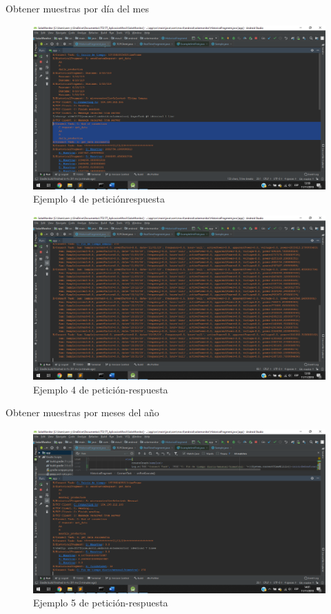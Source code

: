 Obtener muestras por día del mes
\begin{figure}[H]
	\centering
	\includegraphics[scale=.4]{Capitulo5/images/connect8.png}
	\caption{Ejemplo 4 de petición\-respuesta}	\label{fig:connect8}
\end{figure} 

\begin{figure}[H]
	\centering
	\includegraphics[scale=.4]{Capitulo5/images/connect9.png}
	\caption{Ejemplo 4 de petición-respuesta}	\label{fig:connect9}
\end{figure} 


Obtener muestras por meses del año
\begin{figure}[H]
	\centering
	\includegraphics[scale=.4]{Capitulo5/images/connect12.png}
	\caption{Ejemplo 5 de petición-respuesta}	\label{fig:connect12}
\end{figure} 

